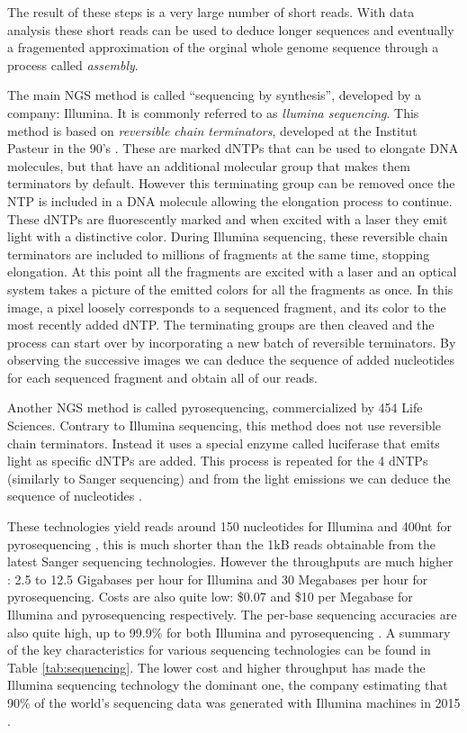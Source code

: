 \documentclass[
  11pt,
  twoside,
  BCOR=10mm,
  listof=totoc]{scrbook}
\begin{document}
The result of these steps is a very large number of short reads. With data analysis these short reads can be used to deduce longer sequences and eventually a fragemented approximation of the orginal whole genome sequence through a process called \emph{assembly}.

The main NGS method is called ``sequencing by synthesis'', developed by a company: Illumina. It is commonly referred to as \emph{llumina sequencing}. This method is based on \emph{reversible chain terminators}, developed at the Institut Pasteur in the 90's \autocite{canardDNAPolymeraseFluorescent1994}. These are marked dNTPs that can be used to elongate DNA molecules, but that have an additional molecular group that makes them terminators by default. However this terminating group can be removed once the NTP is included in a DNA molecule allowing the elongation process to continue. These dNTPs are fluorescently marked and when excited with a laser they emit light with a distinctive color. During Illumina sequencing, these reversible chain terminators are included to millions of fragments at the same time, stopping elongation. At this point all the fragments are excited with a laser and an optical system takes a picture of the emitted colors for all the fragments as once. In this image, a pixel loosely corresponds to a sequenced fragment, and its color to the most recently added dNTP. The terminating groups are then cleaved and the process can start over by incorporating a new batch of reversible terminators. By observing the successive images we can deduce the sequence of added nucleotides for each sequenced fragment and obtain all of our reads.

Another NGS method is called pyrosequencing, commercialized by 454 Life Sciences. Contrary to Illumina sequencing, this method does not use reversible chain terminators. Instead it uses a special enzyme called luciferase that emits light as specific dNTPs are added. This process is repeated for the 4 dNTPs (similarly to Sanger sequencing) and from the light emissions we can deduce the sequence of nucleotides \autocite{nyrenSolidPhaseDNA1993}.

These technologies yield reads around 150 nucleotides for Illumina and 400nt for pyrosequencing \autocite{mardisDecadePerspectiveDNA2011}, this is much shorter than the 1kB reads obtainable from the latest Sanger sequencing technologies. However the throughputs are much higher \autocite{liuComparisonNextGenerationSequencing2012}: 2.5 to 12.5 Gigabases per hour for Illumina and 30 Megabases per hour for pyrosequencing. Costs are also quite low: \$0.07 and \$10 per Megabase for Illumina and pyrosequencing respectively. The per-base sequencing accuracies are also quite high, up to 99.9\% for both Illumina \autocite{stolerSequencingErrorProfiles2021} and pyrosequencing \autocite{liuComparisonNextGenerationSequencing2012}. A summary of the key characteristics for various sequencing technologies can be found in Table \ref{tab:sequencing}. The lower cost and higher throughput has made the Illumina sequencing technology the dominant one, the company estimating that 90\% of the world's sequencing data was generated with Illumina machines in 2015 \autocite{SequencingTechnologySequencing}.
\end{document}
